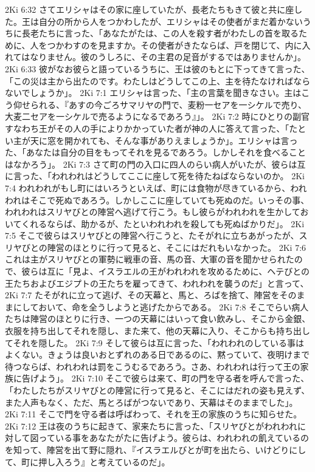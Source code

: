 2Ki 6:32  さてエリシャはその家に座していたが、長老たちもきて彼と共に座した。王は自分の所から人をつかわしたが、エリシャはその使者がまだ着かないうちに長老たちに言った、「あなたがたは、この人を殺す者がわたしの首を取るために、人をつかわすのを見ますか。その使者がきたならば、戸を閉じて、内に入れてはなりません。彼のうしろに、その主君の足音がするではありませんか」。
2Ki 6:33  彼がなお彼らと語っているうちに、王は彼のもとに下ってきて言った、「この災は主から出たのです。わたしはどうしてこの上、主を待たなければならないでしょうか」。
2Ki 7:1  エリシャは言った、「主の言葉を聞きなさい。主はこう仰せられる、『あすの今ごろサマリヤの門で、麦粉一セアを一シケルで売り、大麦二セアを一シケルで売るようになるであろう』」。
2Ki 7:2  時にひとりの副官すなわち王がその人の手によりかかっていた者が神の人に答えて言った、「たとい主が天に窓を開かれても、そんな事がありえましょうか」。エリシャは言った、「あなたは自分の目をもってそれを見るであろう。しかしそれを食べることはなかろう」。
2Ki 7:3  さて町の門の入口に四人のらい病人がいたが、彼らは互に言った、「われわれはどうしてここに座して死を待たねばならないのか。
2Ki 7:4  われわれがもし町にはいろうといえば、町には食物が尽きているから、われわれはそこで死ぬであろう。しかしここに座していても死ぬのだ。いっその事、われわれはスリヤびとの陣営へ逃げて行こう。もし彼らがわれわれを生かしておいてくれるならば、助かるが、たといわれわれを殺しても死ぬばかりだ」。
2Ki 7:5  そこで彼らはスリヤびとの陣営へ行こうと、たそがれに立ちあがったが、スリヤびとの陣営のほとりに行って見ると、そこにはだれもいなかった。
2Ki 7:6  これは主がスリヤびとの軍勢に戦車の音、馬の音、大軍の音を聞かせられたので、彼らは互に「見よ、イスラエルの王がわれわれを攻めるために、ヘテびとの王たちおよびエジプトの王たちを雇ってきて、われわれを襲うのだ」と言って、
2Ki 7:7  たそがれに立って逃げ、その天幕と、馬と、ろばを捨て、陣営をそのままにしておいて、命を全うしようと逃げたからである。
2Ki 7:8  そこでらい病人たちは陣営のほとりに行き、一つの天幕にはいって食い飲みし、そこから金銀、衣服を持ち出してそれを隠し、また来て、他の天幕に入り、そこからも持ち出してそれを隠した。
2Ki 7:9  そして彼らは互に言った、「われわれのしている事はよくない。きょうは良いおとずれのある日であるのに、黙っていて、夜明けまで待つならば、われわれは罰をこうむるであろう。さあ、われわれは行って王の家族に告げよう」。
2Ki 7:10  そこで彼らは来て、町の門を守る者を呼んで言った、「わたしたちがスリヤびとの陣営に行って見ると、そこにはだれの姿も見えず、また人声もなく、ただ、馬とろばがつないであり、天幕はそのままでした」。
2Ki 7:11  そこで門を守る者は呼ばわって、それを王の家族のうちに知らせた。
2Ki 7:12  王は夜のうちに起きて、家来たちに言った、「スリヤびとがわれわれに対して図っている事をあなたがたに告げよう。彼らは、われわれの飢えているのを知って、陣営を出て野に隠れ、『イスラエルびとが町を出たら、いけどりにして、町に押し入ろう』と考えているのだ」。
